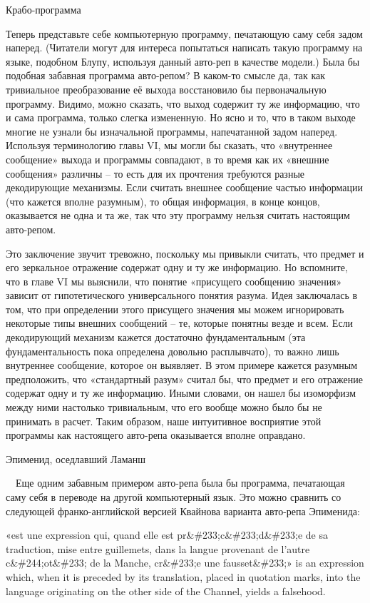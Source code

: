 \documentclass[../main.tex]{subfiles}
\begin{document}
Крабо-программа

Теперь представьте себе компьютерную программу, печатающую саму себя задом наперед. (Читатели могут для интереса попытаться написать такую программу на языке, подобном Блупу, используя данный авто-реп в качестве модели.) Была бы подобная забавная программа авто-репом? В каком-то смысле да, так как тривиальное преобразование её выхода восстановило бы первоначальную программу. Видимо, можно сказать, что выход содержит ту же информацию, что и сама программа, только слегка измененную. Но ясно и то, что в таком выходе многие не узнали бы изначальной программы, напечатанной задом наперед. Используя терминологию главы VI, мы могли бы сказать, что «внутреннее сообщение» выхода и программы совпадают, в то время как их «внешние сообщения» различны \--- то есть для их прочтения требуются разные декодирующие механизмы. Если считать внешнее сообщение частью информации (что кажется вполне разумным), то общая информация, в конце концов, оказывается не одна и та же, так что эту программу нельзя считать настоящим авто-репом.

Это заключение звучит тревожно, поскольку мы привыкли считать, что предмет и его зеркальное отражение содержат одну и ту же информацию. Но вспомните, что в главе VI мы выяснили, что понятие «присущего сообщению значения» зависит от гипотетического универсального понятия разума. Идея заключалась в том, что при определении этого присущего значения мы можем игнорировать некоторые типы внешних сообщений \--- те, которые понятны везде и всем. Если декодирующий механизм кажется достаточно фундаментальным (эта фундаментальность пока определена довольно расплывчато), то важно лишь внутреннее сообщение, которое он выявляет. В этом примере кажется разумным предположить, что «стандартный разум» считал бы, что предмет и его отражение содержат одну и ту же информацию. Иными словами, он нашел бы изоморфизм между ними настолько тривиальным, что его вообще можно было бы не принимать в расчет. Таким образом, наше интуитивное восприятие этой программы как настоящего авто-репа оказывается вполне оправдано.

Эпименид, оседлавший Ламанш

~~Еще одним забавным примером авто-репа была бы программа, печатающая саму себя в переводе на другой компьютерный язык. Это можно сравнить со следующей франко-английской версией Квайнова варианта авто-репа Эпименида:

«est une expression qui, quand elle est pr\&\#233;c\&\#233;d\&\#233;e de sa traduction, mise entre guillemets, dans la langue provenant de l'autre c\&\#244;ot\&\#233; de la Manche, cr\&\#233;e une fausset\&\#233;» is an expression which, when it is preceded by its translation, placed in quotation marks, into the language originating on the other side of the Channel, yields a falsehood.
\end{document}
